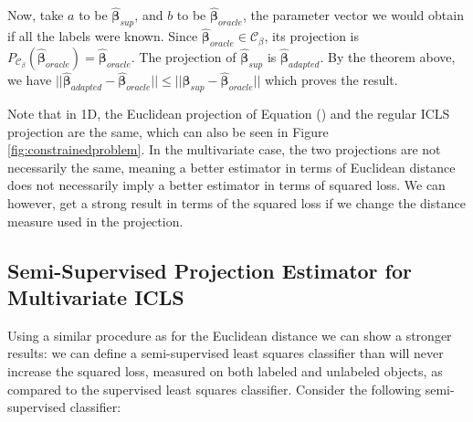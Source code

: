 Now, take $a$ to be $\boldsymbol{\hat{\beta}}_{sup}$, and $b$ to be $\boldsymbol{\hat{\beta}}_{oracle}$, the parameter vector we would obtain if all the labels were known. Since $\boldsymbol{\hat{\beta}}_{oracle} \in \mathcal{C}_{\beta}$, its projection is $P_{\mathcal{C}_{\beta}}(\boldsymbol{\hat{\beta}}_{oracle})=\boldsymbol{\hat{\beta}}_{oracle}$. The projection of $\boldsymbol{\hat{\beta}}_{sup}$ is $\boldsymbol{\hat{\beta}}_{adapted}$. By the theorem above, we have $||\boldsymbol{\hat{\beta}}_{adapted}-\boldsymbol{\hat{\beta}}_{oracle}|| \leq ||\boldsymbol{\hat{\beta}}_{sup}-\boldsymbol{\hat{\beta}}_{oracle}||$ which proves the result.

Note that in 1D, the Euclidean projection of Equation () and the regular ICLS projection are the same, which can also be seen in Figure \ref{fig:constrainedproblem}. In the multivariate case, the two projections are not necessarily the same, meaning a better estimator in terms of Euclidean distance does not necessarily imply a better estimator in terms of squared loss. We can however, get a strong result in terms of the squared loss if we change the distance measure used in the projection.

\subsection{Semi-Supervised Projection Estimator for Multivariate ICLS}

Using a similar procedure as for the Euclidean distance we can show a stronger results: we can define a semi-supervised least squares classifier than will never increase the squared loss, measured on both labeled and unlabeled objects, as compared to the supervised least squares classifier. Consider the following semi-supervised classifier:

